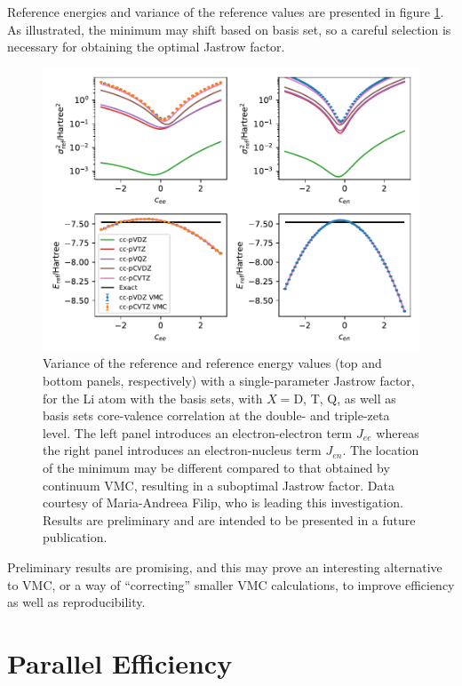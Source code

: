 Reference energies and variance of the reference values are presented in figure \ref{fig:det-opt}. As illustrated, the minimum may shift based on basis set, so a careful selection is necessary for obtaining the optimal Jastrow factor.

\begin{figure}[htbp]
    \centering
    \includegraphics[width=\textwidth]{figures/pytchint/andreea/1parameter}
    \caption{Variance of the reference and reference energy values (top and bottom panels, respectively) with a single-parameter Jastrow factor, for the Li atom with the  basis sets, with $X=$D, T, Q, as well as basis sets core-valence correlation at the double- and triple-zeta level. The left panel introduces an electron-electron term $J_{ee}$ whereas the right panel introduces an electron-nucleus term $J_{en}$. The location of the minimum may be different compared to that obtained by continuum VMC, resulting in a suboptimal Jastrow factor. Data courtesy of Maria-Andreea Filip, who is leading this investigation. Results are preliminary and are intended to be presented in a future publication.}
    \label{fig:det-opt}
\end{figure}

Preliminary results are promising, and this may prove an interesting alternative to \gls{VMC}, or a way of ``correcting'' smaller VMC calculations, to improve efficiency as well as reproducibility.

\section{Parallel Efficiency}

